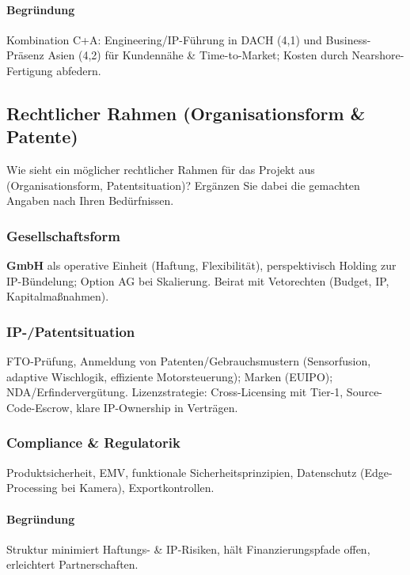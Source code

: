 \documentclass[
%
ngerman %
%
numeric %
]{wbh-assignment}
\begin{document}
\paragraph{Begründung}
Kombination C+A: Engineering/IP-Führung in DACH (4{,}1) und Business-Präsenz Asien (4{,}2) für Kundennähe \& Time-to-Market; Kosten durch Nearshore-Fertigung abfedern.

\bigskip

\subsection{Rechtlicher Rahmen (Organisationsform \& Patente)}
\begin{aufgabenstellung}
Wie sieht ein möglicher rechtlicher Rahmen für das Projekt aus (Organisationsform, Patentsituation)? Ergänzen Sie dabei die gemachten Angaben nach Ihren Bedürfnissen.
\end{aufgabenstellung}

\vspace*{5mm}

\subsubsection{Gesellschaftsform}
\textbf{GmbH} als operative Einheit (Haftung, Flexibilität), perspektivisch Holding zur IP-Bündelung; Option AG bei Skalierung. Beirat mit Vetorechten (Budget, IP, Kapitalmaßnahmen).

\subsubsection{IP-/Patentsituation}
FTO-Prüfung, Anmeldung von Patenten/Gebrauchsmustern (Sensorfusion, adaptive Wischlogik, effiziente Motorsteuerung); Marken (EUIPO); NDA/Erfindervergütung. Lizenzstrategie: Cross-Licensing mit Tier-1, Source-Code-Escrow, klare IP-Ownership in Verträgen.

\subsubsection{Compliance \& Regulatorik}
Produktsicherheit, EMV, funktionale Sicherheitsprinzipien, Datenschutz (Edge-Processing bei Kamera), Exportkontrollen.
\paragraph{Begründung}
Struktur minimiert Haftungs- \& IP-Risiken, hält Finanzierungspfade offen, erleichtert Partnerschaften.
\end{document}

